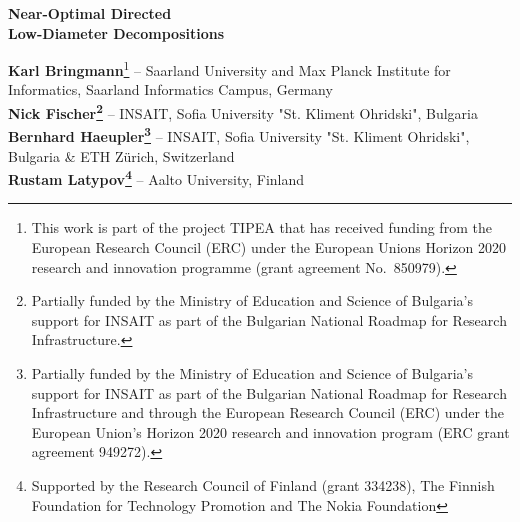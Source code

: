 \documentclass[letterpaper,11pt]{article}
\begin{document}
	
\begin{center}
	\begin{minipage}[H]{14.5cm} 
		
		\begin{center}
		{\huge \bf Near-Optimal Directed\\[.5ex]Low-Diameter Decompositions}
			\end{center}
		\vspace{1cm}
		
		{\large \textbf{Karl Bringmann}\footnote{This work is part of the project TIPEA that has received funding from the European Research Council (ERC) under the European Unions Horizon 2020 research and innovation programme (grant agreement No.~850979).} -- Saarland University and Max Planck Institute for Informatics, Saarland Informatics Campus, Germany} \vspace{1mm}\\
		{\large \textbf{Nick Fischer\footnote{Partially funded by the Ministry of Education and Science of Bulgaria's support for INSAIT as part of the Bulgarian National Roadmap for Research Infrastructure.}} -- INSAIT, Sofia University "St. Kliment Ohridski", Bulgaria} \vspace{1mm}\\
		{\large \textbf{Bernhard Haeupler\footnote{Partially funded by the Ministry of Education and Science of Bulgaria's support for INSAIT as part of the Bulgarian National Roadmap for Research Infrastructure and through the European Research Council (ERC) under the European Union's Horizon 2020 research and innovation program (ERC grant agreement 949272).}} -- INSAIT, Sofia University "St. Kliment Ohridski", Bulgaria \& ETH Zürich, Switzerland} \vspace{1mm}\\
		{\large \textbf{Rustam Latypov\footnote{Supported by the Research Council of Finland (grant 334238), The Finnish Foundation for Technology Promotion and The Nokia Foundation}} -- Aalto University, Finland} \vspace{1mm}\\


		\begin{abstract}
			\noindent
			Low Diameter Decompositions (LDDs) are invaluable tools in the design of combinatorial graph algorithms. While  historically they have been applied mainly to undirected graphs, in the recent breakthrough for the negative-length Single Source Shortest Path problem, Bernstein, Nanongkai, and Wulff-Nilsen [FOCS '22] extended the use of LDDs to directed graphs for the first time. Specifically, their LDD deletes each edge with probability at most , while ensuring that each strongly connected component in the remaining graph has a (weak) diameter of at most $D$.
			

\end{abstract}
\end{minipage}
\end{center}
\end{document}
